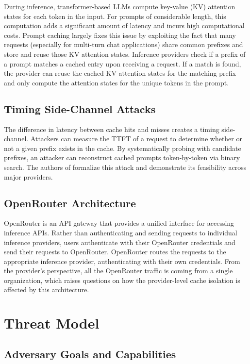 \documentclass[conference]{IEEEtran}
\begin{document}
During inference, transformer-based LLMs compute key-value (KV) attention states for each token in the input.
For prompts of considerable length, this computation adds a significant amount of latency and incurs high computational costs.
Prompt caching largely fixes this issue by exploiting the fact that many requests (especially for multi-turn chat applications) share common prefixes and store and reuse those KV attention states.
Inference providers check if a prefix of a prompt matches a cached entry upon receiving a request.
If a match is found, the provider can reuse the cached KV attention states for the matching prefix and only compute the attention states for the unique tokens in the prompt.

\subsection{Timing Side-Channel Attacks}

The difference in latency between cache hits and misses creates a timing side-channel.
Attackers can measure the TTFT of a request to determine whether or not a given prefix exists in the cache.
By systematically probing with candidate prefixes, an attacker can reconstruct cached prompts token-by-token via binary search.
The authors of \cite{DBLP:conf/icml/GuLKLH25} formalize this attack and demonstrate its feasibility across major providers.

\subsection{OpenRouter Architecture}

OpenRouter is an API gateway that provides a unified interface for accessing inference APIs.
Rather than authenticating and sending requests to individual inference providers, users authenticate with their OpenRouter credentials and send their requests to OpenRouter.
OpenRouter routes the requests to the appropriate inference provider, authenticating with their own credentials.
From the provider's perspective, all the OpenRouter traffic is coming from a single organization, which raises questions on how the provider-level cache isolation is affected by this architecture.

\section{Threat Model}
\label{sec:threat-model}

\subsection{Adversary Goals and Capabilities}
\end{document}
